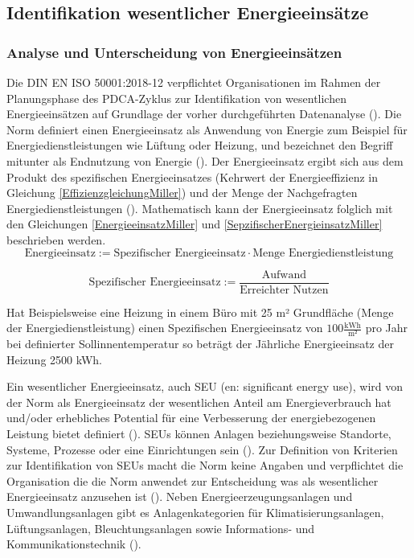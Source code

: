 \subsection{Identifikation wesentlicher Energieeinsätze}

\subsubsection{Analyse und Unterscheidung von Energieeinsätzen}

Die DIN EN ISO 50001:2018-12 verpflichtet Organisationen im Rahmen der Planungsphase des PDCA-Zyklus zur Identifikation von wesentlichen Energieeinsätzen auf Grundlage 
der vorher durchgeführten Datenanalyse (\cite[S. 25]{DIN50001.2018}).
Die Norm definiert einen Energieeinsatz als Anwendung von Energie zum Beispiel für Energiedienstleistungen wie Lüftung oder Heizung, und bezeichnet den Begriff mitunter als 
Endnutzung von Energie (\cite[Kapitel 3.5.4]{DIN50001.2018}). 
Der Energieeinsatz ergibt sich aus dem Produkt des spezifischen Energieeinsatzes (Kehrwert der Energieeffizienz in Gleichung \eqref{EffizienzgleichungMiller}) 
und der Menge der Nachgefragten Energiedienstleistungen (\cite[S. 120]{Miller.2016}).
Mathematisch kann der Energieeinsatz folglich mit den Gleichungen \eqref{EnergieeinsatzMiller} und \eqref{SepzifischerEnergieinsatzMiller} beschrieben werden.
\begin{equation}
    \text{Energieeinsatz} := \text{Spezifischer Energieeinsatz} \cdot \text{Menge Energiedienstleistung}
    \label{EnergieeinsatzMiller}
\end{equation}

\begin{equation}
    \text{Spezifischer Energieeinsatz} :=\frac{\text{Aufwand}}{\text{Erreichter Nutzen}}
    \label{SepzifischerEnergieinsatzMiller}
\end{equation}

Hat Beispielsweise eine Heizung in einem Büro mit 25 m² Grundfläche (Menge der Energiedienstleistung) einen Spezifischen Energieeinsatz von $100 \frac{\text{kWh}}{\text{m²}}$ pro Jahr 
bei definierter Sollinnentemperatur so beträgt der Jährliche Energieeinsatz der Heizung 2500 kWh.

Ein wesentlicher Energieeinsatz, auch SEU (en: significant energy use), wird von der Norm als Energieeinsatz der wesentlichen Anteil am Energieverbrauch 
hat und/oder erhebliches Potential für eine Verbesserung der energiebezogenen Leistung bietet definiert (\cite[Kapitel 3.5.6]{DIN50001.2018}). 
SEUs können Anlagen beziehungsweise Standorte, Systeme, Prozesse oder eine Einrichtungen sein (\cite[Kapitel 3.5.6]{DIN50001.2018}).
Zur Definition von Kriterien zur Identifikation von SEUs macht die Norm keine Angaben und verpflichtet die Organisation die die Norm anwendet zur Entscheidung was 
als wesentlicher Energieeinsatz anzusehen ist (\cite[S. 38]{DIN50001.2018}). 
Neben Energieerzeugungsanlagen und Umwandlungsanlagen gibt es Anlagenkategorien für Klimatisierungsanlagen, 
Lüftungsanlagen, Bleuchtungsanlagen sowie Informations- und Kommunikationstechnik (\cite[S. 14]{Hohnhold.2013}).

